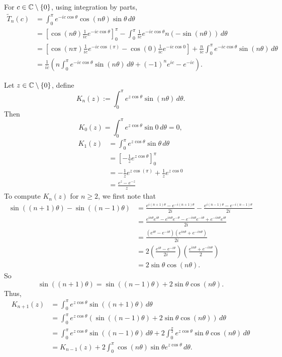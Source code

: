 \documentclass[11pt, oneside, a4paper]{article}
\begin{document}
For $c\in\mathbb C\setminus\{0\}$, using integration by parts,
\begin{align*}
    \tilde{T}_n(c) &= \int_0^\pi e^{-ic\cos\theta}\cos(n\theta)\sin\theta\,d\theta\\
    &= \left[\cos(n\theta)\frac{1}{ic}e^{-ic\cos\theta}\right]_0^{\pi} - \int_0^{\pi}\frac{1}{ic}e^{-ic\cos\theta}n(-\sin(n\theta))\,d\theta\\
    &= \left[\cos(n\pi)\frac{1}{ic}e^{-ic\cos(\pi)} - \cos(0)\frac{1}{ic}e^{-ic\cos 0}\right] + \frac{n}{ic}\int_0^{\pi}e^{-ic\cos\theta}\sin(n\theta)\,d\theta\\
    &= \frac{1}{ic}\left(n\int_0^{\pi}e^{-ic\cos\theta}\sin(n\theta)\,d\theta + (-1)^n e^{ic}- e^{-ic}\right).
\end{align*}

Let $z\in \mathbb C\setminus\{0\}$, define 
\[K_n(z):=\int_0^\pi e^{z\cos\theta}\sin(n\theta)\,d\theta.\]
Then
$$K_0(z) = \int_0^{\pi}e^{z\cos\theta}\sin 0\,d\theta=0,$$
\begin{align*}
K_1(z) &= \int_0^{\pi}e^{z\cos\theta}\sin\theta\,d\theta\\
&= \left[-\frac{1}{z}e^{z\cos\theta}\right]_0^{\pi}\\
&= -\frac{1}{z}e^{z\cos(\pi)} + \frac{1}{z}e^{z\cos 0}\\
&= \frac{e^z - e^{-z}}{z}
\end{align*}
To compute $K_n(z)$ for $n\geq 2$, we first note that
\begin{align*}
\sin((n+1)\theta) - \sin((n-1)\theta) &= \frac{e^{i(n+1)\theta} - e^{-i(n+1)\theta}}{2i} - \frac{e^{i(n-1)\theta} - e^{-i(n-1)\theta}}{2i}\\
&= \frac{e^{in\theta}e^{i\theta} - e^{in\theta}e^{-\theta} - e^{-in\theta}e^{-i\theta} + e^{-in\theta}e^{i\theta}}{2i}\\
&= \frac{(e^{i\theta}-e^{-i\theta})(e^{in\theta}+e^{-in\theta})}{2i}\\
&= 2\left(\frac{e^{i\theta}-e^{-i\theta}}{2i}\right)\left(\frac{e^{in\theta}+e^{-in\theta}}{2}\right)\\
&= 2\sin\theta\cos(n\theta).
\end{align*}
So
$$\sin((n+1)\theta) = \sin((n-1)\theta) + 2\sin\theta\cos(n\theta).$$
Thus,
\begin{align*}
K_{n+1}(z) &= \int_0^{\pi}e^{z\cos\theta}\sin((n+1)\theta)\,d\theta\\
&= \int_0^{\pi}e^{z\cos\theta}(\sin((n-1)\theta) + 2\sin\theta\cos(n\theta))\,d\theta\\
&= \int_0^{\pi}e^{z\cos\theta}\sin((n-1)\theta)\,d\theta + 2\int_0^{\frac{\pi}{2}}e^{z\cos\theta}\sin\theta\cos(n\theta)\,d\theta\\
&= K_{n-1}(z) + 2\int_0^{\pi}\cos(n\theta)\sin\theta e^{z\cos\theta}\,d\theta.
\end{align*}
\end{document}
